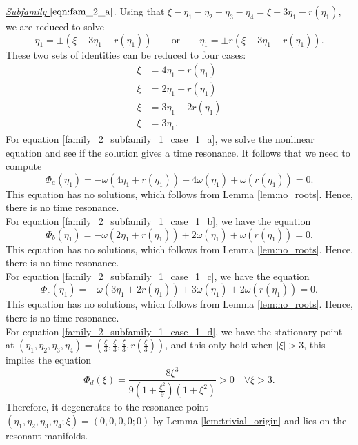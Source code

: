 \documentclass[reqno,english,11pt]{amsart}
\theoremstyle{definition}
\numberwithin{equation}{section}
\begin{document}
\noindent
{\it \underline{Subfamily $\eqref{eqn:fam_2_a}$}}.
Using that $\xi-\eta_1-\eta_2-\eta_3-\eta_4=\xi-3\eta_1-r(\eta_1)$, we are reduced to solve
$$\eta_1=\pm\left(\xi-3\eta_1-r(\eta_1)\right)\qquad \text{or}\qquad \eta_1=\pm r(\xi-3\eta_1-r(\eta_1)).$$
These two sets of identities can be reduced to four cases:
\begin{subequations}
    \begin{align}
         \xi&=4\eta_1+r(\eta_1) \tag{a} \label{family_2_subfamily_1_case_1_a}
  \\
  \xi&=2\eta_1+r(\eta_1) \tag{b} \label{family_2_subfamily_1_case_1_b}
 \\
  \xi&=3\eta_1 +2r(\eta_1) \tag{c} \label{family_2_subfamily_1_case_1_c}
 \\
   \xi&= 3\eta_1. \tag{d} \label{family_2_subfamily_1_case_1_d}
    \end{align} 
\end{subequations}
For equation \eqref{family_2_subfamily_1_case_1_a}, we solve the nonlinear equation and  see if the solution gives a time resonance.  It follows that we need to compute
$$\Phi_a(\eta_1)=-\omega(4\eta_1+r(\eta_1))+4\omega(\eta_1)+\omega(r(\eta_1))=0.$$
This equation has no solutions, which follows from Lemma \ref{lem:no_roots}. Hence, there is no time resonance.\\
\noindent
For equation \eqref{family_2_subfamily_1_case_1_b}, we have the equation 
$$\Phi_b(\eta_1)=-\omega(2\eta_1+r(\eta_1))+2\omega(\eta_1)+\omega(r(\eta_1))=0.$$
This equation has no solutions, which follows from Lemma \ref{lem:no_roots}. Hence, there is no time resonance.
\\
\noindent
For equation \eqref{family_2_subfamily_1_case_1_c}, we have the equation 
$$\Phi_c(\eta_1)=-\omega(3\eta_1+2r(\eta_1))+3\omega(\eta_1)+2\omega(r(\eta_1))=0.$$
This equation has no solutions, which follows from Lemma \ref{lem:no_roots}. Hence, there is no time resonance.
\\
\noindent
For equation \eqref{family_2_subfamily_1_case_1_d}, we have the stationary point at $(\eta_1,\eta_2,\eta_3,\eta_4)=(\frac{\xi}{3},\frac{\xi}{3},\frac{\xi}{3},r(\frac{\xi}{3}))$, and this only hold when $\vert \xi\vert >3$, this implies the equation
$$\Phi_d (\xi)=\frac{8\xi^3}{9(1+\frac{\xi^2}{9})(1+\xi^2)}> 0\quad \forall \xi> 3.$$
Therefore, it degenerates to the resonance point $(\eta_1,\eta_2,\eta_3,\eta_4;\xi)=(0,0,0,0;0)$  by Lemma \ref{lem:trivial_origin} and lies on the resonant manifolds.\\
\end{document}
